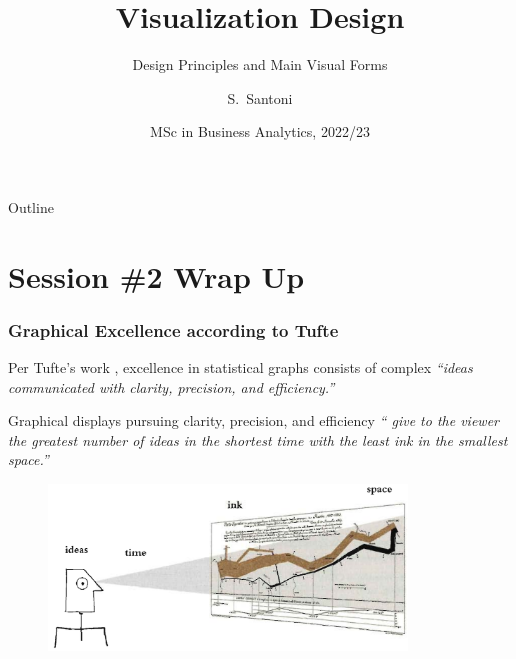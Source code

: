 \documentclass[notes, aspectratio=1610]{beamer}
\title[Visualization Design]%
{Visualization Design}
\subtitle{Design Principles and Main Visual Forms}
\author{S.~Santoni\inst{1}\inst{2}}
\institute{
	\inst{1}%
	Bayes Business School
	\and
	\inst{2}%
	Soundcloud
	}
\date{MSc in Business Analytics, 2022/23}
\begin{document}
\begin{frame}
	\titlepage
\end{frame}

\begin{frame}{Outline}
	\tableofcontents
\end{frame}

\section{Session \#2 Wrap Up}

\begin{frame}
	\frametitle{Graphical Excellence according to Tufte}
	Per Tufte's work \cite{tufte2001}, excellence in statistical graphs consists of complex 
	\emph{``ideas communicated with clarity, precision, and 
	efficiency.''}

	\vspace{1em}

	Graphical displays pursuing clarity, precision, and efficiency \emph{``
	give to the viewer the greatest number of ideas 
	in the shortest time with the least ink in the smallest space.''}

	\begin{figure}
		\begin{small}
			\begin{center}
				\includegraphics[width=0.85\textwidth]{
					images/graphical_excellence.png
					}
			\end{center}
			\caption{}
			\label{fig:}
		\end{small}
	\end{figure}
	
\end{frame}
\end{document}
